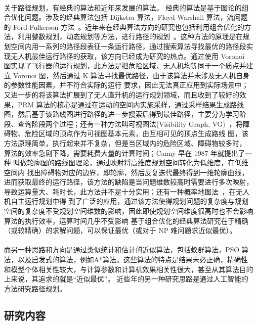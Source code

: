 \documentclass[UTF8,a4paper]{ctexart}
\begin{document}
\paragraph{}关于路径规划，有经典的算法和近年来发展的算法。 经典的算法是基于图论的组合优化问题。涉及的经典算法包括 Dijkstra 算法，Floyd-Warshall 算法，流问题的 Ford-Fulkerson 方法~\cite{introtoalgo}。近年来在经典算法方向的研究也包括利用组合优化的方法，利用整数规划，动态规划等方法，进行路径的规划~\cite{introtoor}。这种方法的原理是在规划空间内用一系列的路径段表征一条运行路径，通过搜索算法寻找最优的路径段实现无人机最佳运行路径的获取，该方向已经成为研究的热点。通过使用 Voronoi 图实现了飞行器的运行规划，此方法是把危险区域、无人机均等同于一个质点并建立 Voronoi 图，然后通过 K 算法寻找最优路径，由于该算法并未涉及无人机自身的参数性能因素，并不符合实际的运行 要求，因此无法真正应用到实际场景中；又进一步的将该算法扩展到了无人直升机的运行规划领域，而且收到了较好的效果，PRM 算法的核心是通过在运动的空间内实施采样，通过采样结果生成路线图，然后基于该路线图进行路径的进一步搜索后得到最佳路径，主要分为学习阶段、查询阶段两个过程；还有一种方法叫可视图法(Visibility Graph, VG)~\cite{2005coordination}，将障碍物、危险区域的顶点作为可视图基本元素，由互相可见的顶点生成路线 图，该方法原理简单，执行起来并不复杂，但是当区域内的危险区域、障碍物较多时， 算法的效率急剧下降，需要耗费大量的计算时间；Canny 早在 1987 年就提出了一种 叫做轮廓图的路线图理论，通过映射将高维度规划空间转化为低维度，在低维空间内 找出障碍物对应的边界，即轮廓，然后反复迭代最终得到一维轮廓曲线，进而获取最终的运行路径，该方法的缺陷是当问题维数较高时需要进行多次映射，导致运算量大、耗时长，此方法并不是十分实用；还有一种概率地图法~\cite{zhangyi2007j}，在无人机自主运行规划中得 到了广泛的应用，通过该方法使得规划问题的复杂度与规划空间的复杂度不受规划空间维数的影响，因此即使规划空间维度很高时也不会影响算法的执行效率，运算时间几乎不受影响 基于组合优化的经典算法研究在于精确（或较精确）的求解问题，可以保证最优（或对于 NP 难问题求近似最优）。~\cite{chenyan2009}
\paragraph{}而另一种思路和方向是通过类似统计和估计的近似算法，包括蚁群算法，PSO 算法，以及启发式的算法，例如A*算法。这些算法的特点是结果未必正确，精确性和模型个体相关性较大，与计算参数和计算机效果相关性很大，甚至从其算法目的上来说，其追求的就是“近似最优”。 近些年的另一种研究思路是通过人工智能的方法研究路径规划。

\subsection{研究内容}
\end{document}
